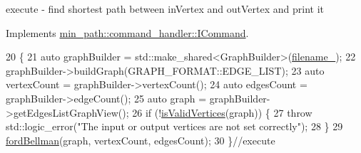 execute -\/ find shortest path between in\+Vertex and out\+Vertex and print it 



Implements \hyperlink{a00008_ab821adbdef63ad2d9b33a222c2a98cc0_ab821adbdef63ad2d9b33a222c2a98cc0}{min\+\_\+path\+::command\+\_\+handler\+::\+I\+Command}.


\begin{DoxyCode}
20                                               \{
21             \textcolor{keyword}{auto} graphBuilder = std::make\_shared<GraphBuilder>(\hyperlink{a00005_ab906462d177f146fcd35aa0011868eda_ab906462d177f146fcd35aa0011868eda}{filename\_});
22             graphBuilder->buildGraph(GRAPH\_FORMAT::EDGE\_LIST);
23             \textcolor{keyword}{auto} vertexCount = graphBuilder->vertexCount();
24             \textcolor{keyword}{auto} edgesCount = graphBuilder->edgeCount();
25             \textcolor{keyword}{auto} graph = graphBuilder->getEdgesListGraphView();
26             \textcolor{keywordflow}{if} (!\hyperlink{a00005_a7e7ff6cdcf150a9f4d90f44380109099_a7e7ff6cdcf150a9f4d90f44380109099}{isValidVertices}(graph)) \{
27                 \textcolor{keywordflow}{throw} std::logic\_error(\textcolor{stringliteral}{"The input or output vertices are not set correctly"});
28             \}
29             \hyperlink{a00005_aaa85abbc782e92802f88fe94e8b39623_aaa85abbc782e92802f88fe94e8b39623}{fordBellman}(graph, vertexCount, edgesCount);
30         \}\textcolor{comment}{//execute}
\end{DoxyCode}
